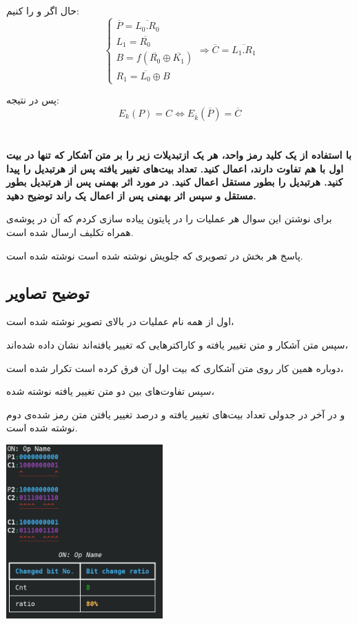 \documentclass[dvipsnames, svgnames, x11names]{article}
\begin{document}
\begin{enumerate}[label=\alph*)]
حال اگر 
و 
را 
کنیم:
\begin{equation}
\begin{cases}
\overline{P} = \overline{L_0.R_0}\\
L_1 = \overline{R_0} \\
B = f(\overline{R_0} \oplus \overline{K_1}) \\
R_1 = \overline{L_0} \oplus B
\end{cases}
\Rightarrow \overline{C} = \overline{L_1.R_1}
\end{equation}

پس در نتیجه:
\begin{equation}
E_k(P) = C \iff E_{\overline{k}}(\overline{P}) = \overline{C}
\end{equation}
\end{enumerate}

\section{}
{\large \textbf{با استفاده از یک کلید رمز واحد، هر یک ازتبدیلات زیر را بر متن آشکار که تنها در بیت اول با هم تفاوت دارند، اعمال کنید. تعداد بیت‌های تغییر یافته پس از هرتبدیل را پیدا کنید. هرتبدیل را بطور مستقل اعمال کنید. در مورد اثر بهمنی پس از هرتبدیل بطور مستقل و سپس اثر بهمنی پس از اعمال یک راند توضیح دهید.}}

برای نوشتن این سوال هر عملیات 
را در پایتون پیاده سازی کردم که 
آن در پوشه‌ی 
همراه تکلیف ارسال شده است.

پاسخ هر بخش در تصویری که جلویش نوشته شده‌ است نوشته شده است.

\subsection{توضیح تصاویر}
\begin{multicols}{2}
اول از همه نام عملیات در بالای تصویر نوشته شده است،

سپس متن آشکار و متن تغییر یافته و کاراکتر‌هایی که تغییر یافته‌اند نشان داده شده‌اند،

دوباره همین کار روی متن آشکاری که بیت اول آن فرق کرده است تکرار شده است،

سپس تفاوت‌های بین دو متن تغییر یافته نوشته شده،

و در آخر در جدولی تعداد بیت‌های تغییر یافته و درصد تغییر یافتن متن رمز شده‌ی دوم نوشته شده است.

\includegraphics[width=0.45\textwidth, height=0.35\textheight]{exam}
\end{multicols}
\end{document}
